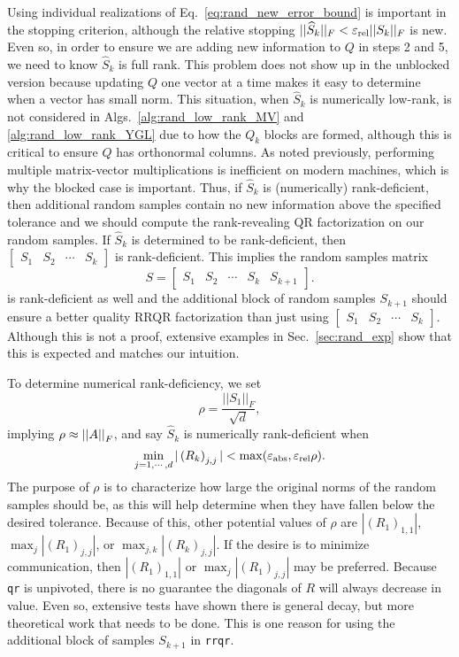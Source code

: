 \noindent
Using individual realizations of Eq.~\eqref{eq:rand_new_error_bound}
is important in the stopping criterion, although the relative stopping
$||\widehat{S}_{k}||_{F} < \varepsilon_{\text{rel}}||S_{k}||_{F}$ is new.
Even so, in order to ensure we are adding new information to $Q$ in steps
2 and 5, we need to know $\widehat{S}_{k}$ is full rank.
This problem does not show up in the unblocked version because
updating $Q$ one vector at a time makes it easy to determine
when a vector has small norm.
This situation, when $\widehat{S}_{k}$ is numerically low-rank,
is not considered in
Algs.~\ref{alg:rand_low_rank_MV} and \ref{alg:rand_low_rank_YGL}
due to how the $Q_{k}$ blocks are formed,
although this is critical to ensure $Q$ has orthonormal columns.
As noted previously, performing multiple matrix-vector multiplications
is inefficient on modern machines, which is why the blocked case is important.
Thus, if $\widehat{S}_{k}$ is (numerically) rank-deficient,
then additional random samples contain no new information above the
specified tolerance and we should
compute the rank-revealing QR factorization on our random samples.
If $\widehat{S}_{k}$ is determined to be rank-deficient, then
$\begin{bmatrix} S_{1} & S_{2} & \cdots & S_{k} \end{bmatrix}$
is rank-deficient.
This implies the random samples matrix
%
\begin{equation}
    S = \begin{bmatrix} S_{1} & S_{2} & \cdots & S_{k} & S_{k+1} \end{bmatrix}.
\end{equation}
%
is rank-deficient as well and the additional block of random samples $S_{k+1}$
should ensure a better quality RRQR factorization than just using
$\begin{bmatrix} S_{1} & S_{2} & \cdots & S_{k} \end{bmatrix}$.
Although this is not a proof, extensive examples
in Sec.~\ref{sec:rand_exp} show that this is expected
and matches our intuition.

To determine numerical rank-deficiency, we set
%
\begin{equation}
    \rho = \frac{||S_{1}||_{F}}{\sqrt{d}},
\end{equation}
%
implying $\rho\approx\left| \left| A \right| \right|_{F}$,
and say $\widehat{S}_{k}$ is numerically rank-deficient when
%
\begin{equation}
    \min_{j=1,\cdots,d} |\left( R_{k} \right)_{j,j}| < \max(\varepsilon_{\text{abs}},\varepsilon_{\text{rel}}\rho).
\end{equation}
%
The purpose of $\rho$ is to characterize how large the original norms
of the random samples should be, as this will help determine when
they have fallen below the desired tolerance.
Because of this, other potential values of $\rho$ are $|(R_{1})_{1,1}|$,
$\max_{j} |(R_{1})_{j,j}|$, or $\max_{j,k} |(R_{k})_{j,j}|$.
If the desire is to minimize communication, then
$|(R_{1})_{1,1}|$ or $\max_{j} |(R_{1})_{j,j}|$ may be preferred.
Because \texttt{qr} is unpivoted, there is no guarantee the diagonals
of $R$ will always decrease in value.
Even so, extensive tests have shown there is general decay, but more
theoretical work that needs to be done.
This is one reason for using the additional block of
samples $S_{k+1}$ in \texttt{rrqr}.


